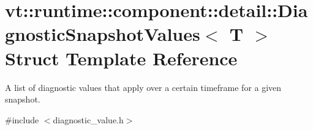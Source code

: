 \hypertarget{structvt_1_1runtime_1_1component_1_1detail_1_1_diagnostic_snapshot_values}{}\section{vt\+:\+:runtime\+:\+:component\+:\+:detail\+:\+:Diagnostic\+Snapshot\+Values$<$ T $>$ Struct Template Reference}
\label{structvt_1_1runtime_1_1component_1_1detail_1_1_diagnostic_snapshot_values}


A list of diagnostic values that apply over a certain timeframe for a given snapshot.  




{\ttfamily \#include $<$diagnostic\+\_\+value.\+h$>$}

